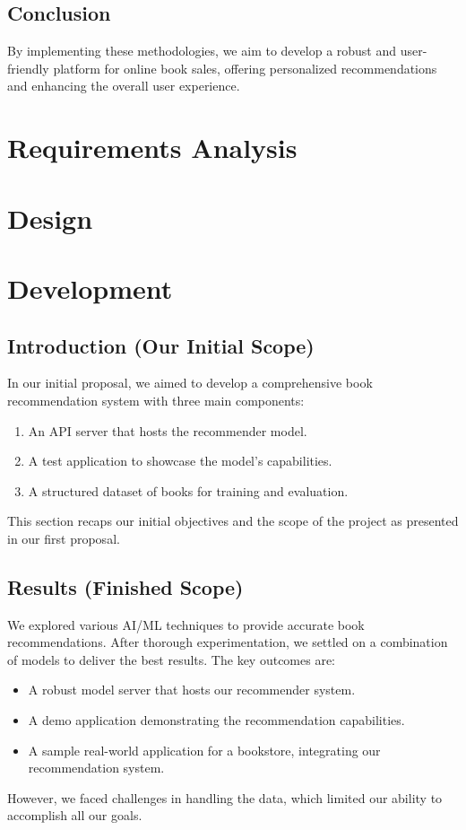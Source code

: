 \documentclass{article}
\begin{document}
\subsection{Conclusion}

By implementing these methodologies, we aim to develop a robust and user-friendly platform for online book sales, offering personalized recommendations and enhancing the overall user experience.


\section{Requirements Analysis}

\section{Design}

\section{Development}

\subsection{Introduction (Our Initial Scope)}

In our initial proposal, we aimed to develop a comprehensive book recommendation system with three main components:
\begin{enumerate}
    \item An API server that hosts the recommender model.
    \item A test application to showcase the model's capabilities.
    \item A structured dataset of books for training and evaluation.
\end{enumerate}
This section recaps our initial objectives and the scope of the project as presented in our first proposal.

\subsection{Results (Finished Scope)}

We explored various AI/ML techniques to provide accurate book recommendations. After thorough experimentation, we settled on a combination of models to deliver the best results. The key outcomes are:
\begin{itemize}
    \item A robust model server that hosts our recommender system.
    \item A demo application demonstrating the recommendation capabilities.
    \item A sample real-world application for a bookstore, integrating our recommendation system.
\end{itemize}
However, we faced challenges in handling the data, which limited our ability to accomplish all our goals.
\end{document}

